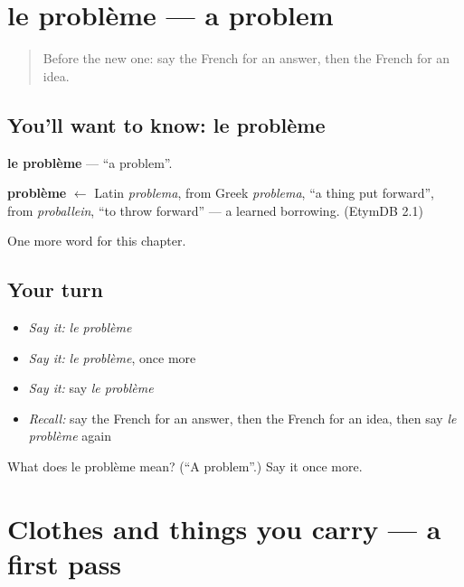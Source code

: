 \section[le problème]{le problème — a problem}

\label{lesson:FR-C127-probleme}



\begin{quote}
Before the new one: say the French for an answer, then the French for an idea.
\end{quote}

\subsection*{You'll want to know: le problème}
\textbf{le problème} — \textquotedblleft{}a problem\textquotedblright{}.

\begin{cousinweb}
\textbf{problème} $\leftarrow$ Latin \emph{problema}, from Greek \emph{problema}, \textquotedblleft{}a thing put forward\textquotedblright{}, from \emph{proballein}, \textquotedblleft{}to throw forward\textquotedblright{} — a learned borrowing. (EtymDB 2.1)
\end{cousinweb}

\begin{grammarlens}[title={What you've built}]
One more word for this chapter.
\end{grammarlens}

\subsection*{Your turn}
\begin{itemize}
\raggedright
  \item \emph{Say it:} \emph{le problème}
  \item \emph{Say it:} \emph{le problème}, once more
  \item \emph{Say it:} say \emph{le problème}
  \item \emph{Recall:} say the French for an answer, then the French for an idea, then say \emph{le problème} again
\end{itemize}

\begin{tcolorbox}[breakable,colback=teal!4,colframe=teal!35!black,title={Before you move on}]
What does le problème mean? (\textquotedblleft{}A problem\textquotedblright{}.) Say it once more.
\end{tcolorbox}
\section[(dialogue)]{Clothes and things you carry — a first pass}


